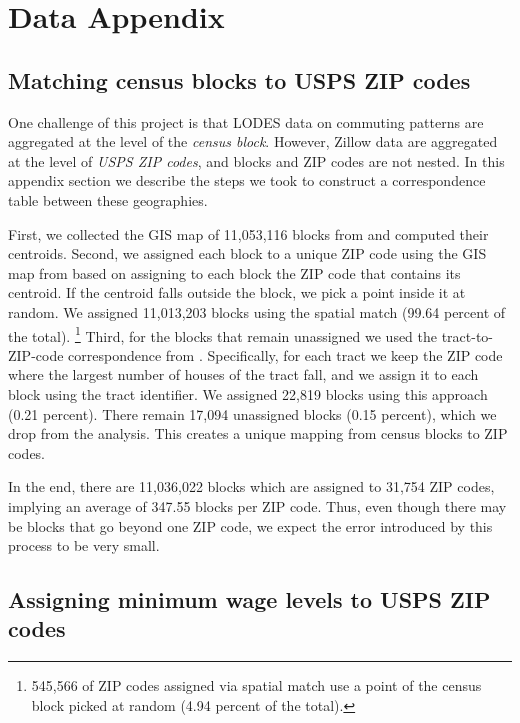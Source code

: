 \section{Data Appendix}

\subsection{Matching census blocks to USPS ZIP codes}
\label{sec:blocks_to_uspszip}

One challenge of this project is that LODES data on commuting patterns are 
aggregated at the level of the \textit{census block}.
However, Zillow data are aggregated at the level of \textit{USPS ZIP codes},
and blocks and ZIP codes are not nested.
In this appendix section we describe the steps we took to construct a 
correspondence table between these geographies.

First, we collected the GIS map of 11,053,116 blocks from \textcite{cbTiger} and
computed their centroids.
Second, we assigned each block to a unique ZIP code using the GIS map from 
\textcite{ESRI} based on assigning to each block the ZIP code that contains its 
centroid.
If the centroid falls outside the block, we pick a point inside it at random.
We assigned 11,013,203 blocks using the spatial match (99.64 percent of the 
total).%
\footnote{545,566 of ZIP codes assigned via spatial match use 
a point of the census block picked at random (4.94 percent of the total).}
Third, for the blocks that remain unassigned we used the tract-to-ZIP-code 
correspondence from \textcite{hudCrosswalks}.
Specifically, for each tract we keep the ZIP code where the largest number 
of houses of the tract fall, and we assign it to each block using the tract 
identifier.
We assigned 22,819 blocks using this approach (0.21 percent).
There remain 17,094 unassigned blocks (0.15 percent), which we drop from the 
analysis.
This creates a unique mapping from census blocks to ZIP codes.

In the end, there are 11,036,022 blocks which are assigned to 31,754 ZIP codes, 
implying an average of 347.55 blocks per ZIP code.
Thus, even though there may be blocks that go beyond one ZIP code, we expect 
the error introduced by this process to be very small.

\subsection{Assigning minimum wage levels to USPS ZIP codes}
\label{sec:assigning_mw_levels}

